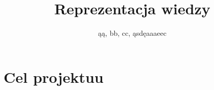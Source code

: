 \documentclass{article}
\title{Reprezentacja wiedzy}
\author{ąą, bb, cc, ąsdęaaaeec}
\begin{document}
\maketitle


\section{Cel projektuu}
\end{document}
